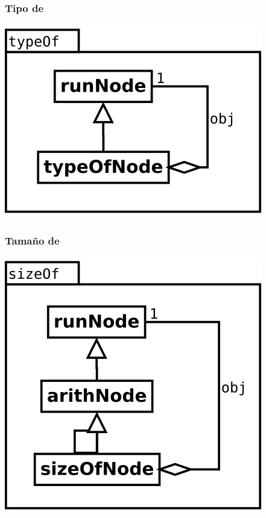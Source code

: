 \subsubsection {Tipo de} 
\begin{center}
\includegraphics[scale=0.4]{typeOf.png} \\
\end{center}

\subsubsection {Tamaño de} 
\begin{center}
\includegraphics[scale=0.4]{sizeOf.png} \\
\end{center}

